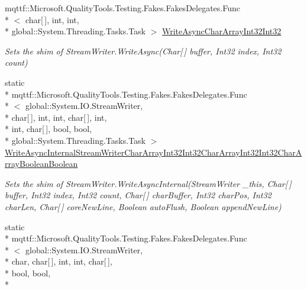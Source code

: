 \begin{DoxyCompactItemize}
mqttf\-::\-Microsoft.\-Quality\-Tools.\-Testing.\-Fakes.\-Fakes\-Delegates.\-Func\\*
$<$ char\mbox{[}$\,$\mbox{]}, int, int, \\*
global\-::\-System.\-Threading.\-Tasks.\-Task $>$ \hyperlink{class_system_1_1_i_o_1_1_fakes_1_1_shim_stream_writer_a9ae24c314724461e107bab2957a82b1a}{Write\-Async\-Char\-Array\-Int32\-Int32}
\begin{DoxyCompactList}\small\item\em Sets the shim of Stream\-Writer.\-Write\-Async(\-Char\mbox{[}$\,$\mbox{]} buffer, Int32 index, Int32 count)\end{DoxyCompactList}\item 
static \\*
mqttf\-::\-Microsoft.\-Quality\-Tools.\-Testing.\-Fakes.\-Fakes\-Delegates.\-Func\\*
$<$ global\-::\-System.\-I\-O.\-Stream\-Writer, \\*
char\mbox{[}$\,$\mbox{]}, int, int, char\mbox{[}$\,$\mbox{]}, int, \\*
int, char\mbox{[}$\,$\mbox{]}, bool, bool, \\*
global\-::\-System.\-Threading.\-Tasks.\-Task $>$ \hyperlink{class_system_1_1_i_o_1_1_fakes_1_1_shim_stream_writer_afcaf231b71837dd1b3a74fe2acf479e9}{Write\-Async\-Internal\-Stream\-Writer\-Char\-Array\-Int32\-Int32\-Char\-Array\-Int32\-Int32\-Char\-Array\-Boolean\-Boolean}
\begin{DoxyCompactList}\small\item\em Sets the shim of Stream\-Writer.\-Write\-Async\-Internal(\-Stream\-Writer \-\_\-this, Char\mbox{[}$\,$\mbox{]} buffer, Int32 index, Int32 count, Char\mbox{[}$\,$\mbox{]} char\-Buffer, Int32 char\-Pos, Int32 char\-Len, Char\mbox{[}$\,$\mbox{]} core\-New\-Line, Boolean auto\-Flush, Boolean append\-New\-Line)\end{DoxyCompactList}\item 
static \\*
mqttf\-::\-Microsoft.\-Quality\-Tools.\-Testing.\-Fakes.\-Fakes\-Delegates.\-Func\\*
$<$ global\-::\-System.\-I\-O.\-Stream\-Writer, \\*
char, char\mbox{[}$\,$\mbox{]}, int, int, char\mbox{[}$\,$\mbox{]}, \\*
bool, bool, \\*

\end{DoxyCompactItemize}
